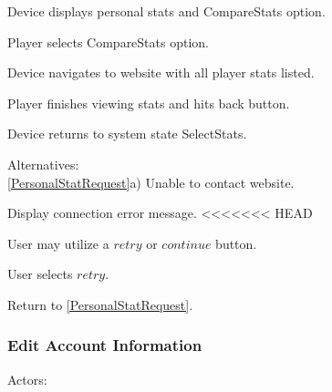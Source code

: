 \documentclass[12pt]{article}
\newenvironment{itemize*}%
  {\begin{itemize}%
  	\setlength{\parsep}{0pt}
    \setlength{\itemsep}{0pt}%
    \setlength{\parskip}{0pt}}%
  {\end{itemize}}
\newenvironment{enumerate*}%
  {\begin{enumerate}%
  	\setlength{\parsep}{0pt}
    \setlength{\itemsep}{0pt}%
    \setlength{\parskip}{0pt}}%
  {\end{enumerate}}
\begin{document}
\begin{itemize*}
\begin{enumerate*}
\item Device displays personal stats and CompareStats option.
\item \label{CompareStats}Player selects CompareStats option.
\item Device navigates to website with all player stats listed.
\item \label{Back}Player finishes viewing stats and hits back button.
\item Device returns to system state SelectStats.
\end{enumerate*}
Alternatives:\\
\ref{PersonalStatRequest}a) Unable to contact website.
\begin{enumerate*}
\item Display connection error message.
<<<<<<< HEAD
\item User may utilize a $retry$ or $continue$ button.
\item User selects $retry$.
\item Return to \ref{PersonalStatRequest}.
\end{enumerate*}

\subsubsection*{Edit Account Information}
Actors:
\end{itemize*}
\end{document}
